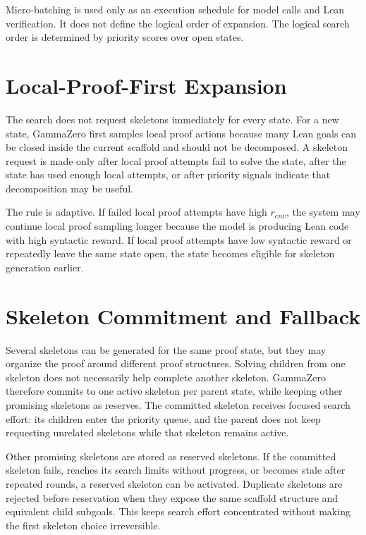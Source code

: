 \documentclass[en]{uet_awesome_thesis/uet-awesome-thesis}
\begin{document}
Micro-batching is used only as an execution schedule for model calls and Lean verification. It does not define the logical order of expansion. The logical search order is determined by priority scores over open states.

\section{Local-Proof-First Expansion}

The search does not request skeletons immediately for every state. For a new state, GammaZero first samples local proof actions because many Lean goals can be closed inside the current scaffold and should not be decomposed. A skeleton request is made only after local proof attempts fail to solve the state, after the state has used enough local attempts, or after priority signals indicate that decomposition may be useful.

The rule is adaptive. If failed local proof attempts have high \(r_{env}\), the system may continue local proof sampling longer because the model is producing Lean code with high syntactic reward. If local proof attempts have low syntactic reward or repeatedly leave the same state open, the state becomes eligible for skeleton generation earlier.

\section{Skeleton Commitment and Fallback}

Several skeletons can be generated for the same proof state, but they may organize the proof around different proof structures. Solving children from one skeleton does not necessarily help complete another skeleton. GammaZero therefore commits to one active skeleton per parent state, while keeping other promising skeletons as reserves. The committed skeleton receives focused search effort: its children enter the priority queue, and the parent does not keep requesting unrelated skeletons while that skeleton remains active.

Other promising skeletons are stored as reserved skeletons. If the committed skeleton fails, reaches its search limits without progress, or becomes stale after repeated rounds, a reserved skeleton can be activated. Duplicate skeletons are rejected before reservation when they expose the same scaffold structure and equivalent child subgoals. This keeps search effort concentrated without making the first skeleton choice irreversible.
\end{document}
